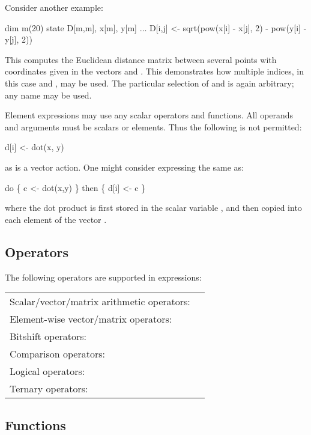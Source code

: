 Consider another example:
\begin{bicode}
dim m(20)
state D[m,m], x[m], y[m]
\(\ldots\)
D[i,j] <- sqrt(pow(x[i] - x[j], 2) - pow(y[i] - y[j], 2))
\end{bicode}

This computes the Euclidean distance matrix  between several points
with coordinates given in the vectors  and . This
demonstrates how multiple indices, in this case  and , may
be used. The particular selection of  and  is again
arbitrary; any name may be used.

Element expressions may use any scalar operators and functions. All operands
and arguments must be scalars or elements. Thus the following is not
permitted:
\begin{bicode}
d[i] <- dot(x, y)
\end{bicode}
as  is a vector action. One might consider expressing the same
as:
\begin{bicode}
do \{
  c <- dot(x,y)
\} then \{
  d[i] <- c
\}
\end{bicode}
where the dot product is first stored in the scalar variable , and
then copied into each element of the vector .

\subsection{Operators\label{Operators}}

The following operators are supported in expressions:

\noindent
\begin{tabular}{lr}
\hline
Scalar/vector/matrix arithmetic operators: & \bitt{+ - * / \% \^{}} \\
Element-wise vector/matrix operators:  & \bitt{.+ .- .* ./ .\% .\^{}} \\
Bitshift operators: & \bitt{<< >>} \\
Comparison operators: & \bitt{== != < <= > >= } \\
Logical operators: & \bitt{\&\& ||} \\
Ternary operators: & \bitt{?:} \\
\hline
\end{tabular}

\subsection{Functions\label{Functions}}

